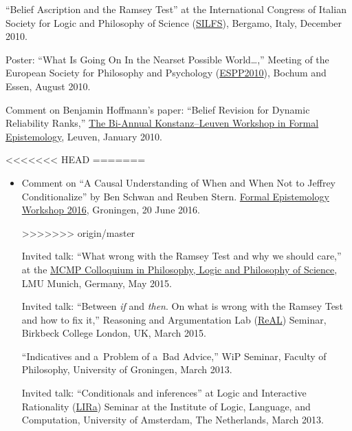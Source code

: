 \documentclass[11pt,article,oneside]{memoir}
\begin{document}
\begin{itemize}
    \ind ``Belief Ascription and the Ramsey Test'' at the International Congress of Italian Society for Logic and Philosophy of Science (\href{http://dinamico2.unibg.it/silfs/convegno2010.htm}{SILFS}), Bergamo, Italy, December 2010. 

	\ind Poster: ``What Is Going On In the Nearset Possible World\ldots,'' Meeting of the European Society for Philosophy and  Psychology (\href{http://www.ruhr-uni-bochum.de/philosophy/espp2010/index.html}{ESPP2010}), Bochum and Essen, August 2010.

	\ind Comment on Benjamin Hoffmann's paper: ``Belief Revision for Dynamic Reliability Ranks,'' \href{http://formalphilosophy.org/node/580}{The Bi-Annual Konstanz--Leuven Workshop in Formal Epistemology}, Leuven, January 2010.

  
  

<<<<<<< HEAD
\bigskip 
=======
  \begin{itemize}
  \item Comment on  ``A Causal Understanding of When and When Not to Jeffrey Conditionalize'' by Ben Schwan and Reuben Stern. \href{http://www.philos.rug.nl/few2016/}{Formal Epistemology Workshop 2016}, Groningen, 20 June 2016.

>>>>>>> origin/master

\medskip

    \ind Invited talk: ``What wrong with the Ramsey Test and why we should care,'' at the \href{http://www.mcmp.philosophie.uni-muenchen.de/events/weekly_talks_new/index.html}{MCMP Colloquium in Philosophy, Logic and Philosophy of Science}, LMU Munich, Germany, May 2015.

    \ind Invited talk: ``Between \emph{if} and \emph{then}. On what is wrong with the Ramsey Test and how to fix it,'' Reasoning and Argumentation Lab (\href{http://www.bbk.ac.uk/psychology/ral}{ReAL}) Seminar, Birkbeck College London, UK, March 2015.

	\ind ``Indicatives and a~Problem of a~Bad Advice,'' WiP Seminar, Faculty of Philosophy, University of Groningen, March 2013.

    \ind Invited talk: ``Conditionals and inferences'' at Logic and Interactive Rationality (\href{http://www.illc.uva.nl/lgc/seminar/}{LIRa}) Seminar at the Institute of Logic, Language, and Computation, University of Amsterdam, The Netherlands, March 2013.


\end{itemize}
\end{itemize}
\end{document}

